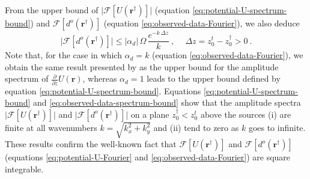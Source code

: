 From the upper bound of $\vert \mathcal{F} [ U(\mathbf{r}^{\dagger}) ] \vert$
(equation \ref{eq:potential-U-spectrum-bound}) and $\mathcal{F} [ d^{o}(\mathbf{r}^{\dagger}) ]$
(equation \ref{eq:observed-data-Fourier}), we also deduce
\begin{equation}
	\vert \mathcal{F} [ d^{o}(\mathbf{r}^{\dagger}) ] \vert \le
	\vert \alpha_{d} \vert \, \Omega \, 
	\frac{e^{- k \, \Delta z}}{k} \: ,
	\: \quad \Delta z = z^{t}_{0} - z^{\dagger}_{0} > 0 \: .
	\label{eq:observed-data-spectrum-bound}
\end{equation}
Note that, for the case in which $\alpha_{d} = k$ (equation \ref{eq:observed-data-Fourier}), 
we obtain the same result presented by \citet{bhattacharyya1967} as the upper bound for the 
amplitude spectrum of $\tfrac{\partial}{\partial z} U(\mathbf{r})$, whereas
$\alpha_{d} = 1$ leads to the upper bound defined by equation \ref{eq:potential-U-spectrum-bound}.
Equations \ref{eq:potential-U-spectrum-bound} and \ref{eq:observed-data-spectrum-bound} 
show that the amplitude spectra 
$\vert \mathcal{F} [ U(\mathbf{r}^{\dagger}) ] \vert$ and 
$\vert \mathcal{F} [ d^{o}(\mathbf{r}^{\dagger}) ] \vert$ on a plane $z^{\dagger}_{0} < z^{t}_{0}$ 
above the sources 
(i) are finite at all wavenumbers $k = \sqrt{k_{x}^{2} + k_{y}^{2}}$ and (ii) tend
to zero as $k$ goes to infinite.
These results confirm the well-known fact that 
$\mathcal{F} [ U(\mathbf{r}^{\dagger}) ]$ and $\mathcal{F} [ d^{o}(\mathbf{r}^{\dagger}) ]$ 
(equations \ref{eq:potential-U-Fourier} and \ref{eq:observed-data-Fourier}) are square integrable.